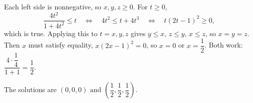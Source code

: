 Each left side is nonnegative, so $x,y,z\ge0$. For $t\ge0$,
\[
\dfrac{4t^2}{1+4t^2}\le t\quad\Longleftrightarrow\quad 4t^2\le t+4t^3\quad\Longleftrightarrow\quad t(2t-1)^2\ge0,
\]
which is true. Applying this to $t=x,y,z$ gives $y\le x$, $z\le y$, $x\le z$, so $x=y=z$. Then $x$ must satisfy equality, $x(2x-1)^2=0$, so $x=0$ or $x=\dfrac{1}{2}$. Both work: $\dfrac{4\cdot\dfrac{1}{4}}{1+1}=\dfrac{1}{2}$.

The solutions are $\boxed{(0,0,0)\text{ and }\left(\dfrac{1}{2},\dfrac{1}{2},\dfrac{1}{2}\right)}$.
